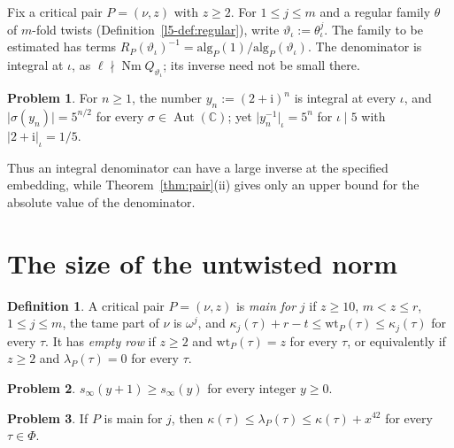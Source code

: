 \documentclass[reqno]{amsart}
\theoremstyle{definition}
\newtheorem{problem}{Problem}[section]
\newtheorem{definition}{Definition}[section]
\theoremstyle{plain}
\theoremstyle{remark}
\newcommand{\C}{\mathbb{C}}
\newcommand{\ii}{\mathrm{i}}
\newcommand{\Aut}{\operatorname{Aut}}
\newcommand{\Nm}{\operatorname{Nm}}
\newcommand{\wt}{\mathrm{wt}}
\newcommand{\alg}{\mathrm{alg}}
\begin{document}
Fix a critical pair \(P = (\nu, z)\) with \(z \ge 2\).  For \(1 \le j \le m\) and a regular family \(\theta\) of \(m\)-fold twists (Definition~\ref{l5-def:regular}), write \(\vartheta_\iota := \theta_\iota^j\).  The family to be estimated has terms \(R_P(\vartheta_\iota)^{-1} = \alg_P(1)/\alg_P(\vartheta_\iota)\).  The denominator is integral at \(\iota\), as \(\ell \nmid \Nm Q_{\vartheta_\iota}\); its inverse need not be small there.

\begin{problem}\label{pr:direction}
For \(n \ge 1\), the number \(y_n := (2+\ii)^n\) is integral at every \(\iota\), and \(\lvert\sigma(y_n)\rvert = 5^{n/2}\) for every \(\sigma \in \Aut(\C)\); yet \(\lvert y_n^{-1}\rvert_\iota = 5^n\) for \(\iota \mid 5\) with \(\lvert 2+\ii\rvert_\iota = 1/5\).
\end{problem}

Thus an integral denominator can have a large inverse at the specified embedding, while Theorem~\ref{thm:pair}(ii) gives only an upper bound for the absolute value of the denominator.

\section{The size of the untwisted norm}\label{sec:size}

\begin{definition}\label{def:main}
A critical pair \(P = (\nu, z)\) is \emph{main for} \(j\) if \(z \ge 10\), \(m < z \le r\), \(1 \le j \le m\), the tame part of \(\nu\) is \(\omega^j\), and \(\kappa_j(\tau) + r - t \le \wt_P(\tau) \le \kappa_j(\tau)\) for every \(\tau\).  It has \emph{empty row} if \(z \ge 2\) and \(\wt_P(\tau) = z\) for every \(\tau\), or equivalently if \(z \ge 2\) and \(\lambda_P(\tau) = 0\) for every \(\tau\).
\end{definition}

\begin{problem}\label{pr:jet-mono}
\(s_\infty(y+1) \ge s_\infty(y)\) for every integer \(y \ge 0\).
\end{problem}

\begin{problem}\label{pr:row-range}
If \(P\) is main for \(j\), then \(\kappa(\tau) \le \lambda_P(\tau) \le \kappa(\tau) + x^{42}\) for every \(\tau \in \Phi\).
\end{problem}
\end{document}
